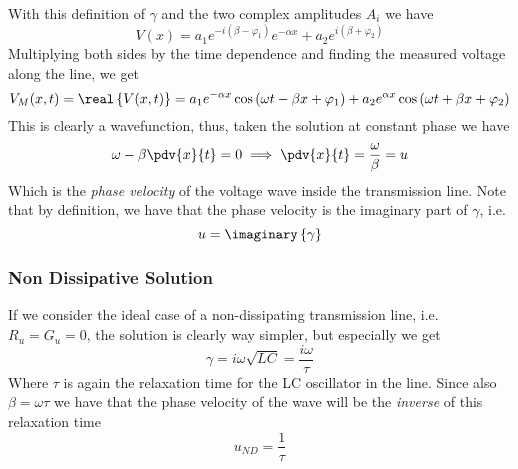 \documentclass[../electromagnetism.tex]{subfiles}
\begin{document}
With this definition of $\gamma$ and the two complex amplitudes $A_i$ we have
\begin{equation*}
	V(x)=a_1e^{-i\left( \beta-\varphi_1 \right)}e^{-\alpha x}+a_2e^{i\left(\beta+\varphi_2 \right)}
\end{equation*}
Multiplying both sides by the time dependence and finding the measured voltage along the line, we get
\begin{equation}
	V_M(x, t)=\real\left\{ V(x, t) \right\}=a_1e^{-\alpha x}\cos\left( \omega t-\beta x+\varphi_1 \right)+a_2e^{\alpha x}\cos\left( \omega t+\beta x+\varphi_2 \right)
	\label{eq:measvolt.tra}
\end{equation}
This is clearly a wavefunction, thus, taken the solution at constant phase we have
\begin{equation}
	\omega-\beta\pdv{x}{t}=0\implies\pdv{x}{t}=\frac{\omega}{\beta}=u
	\label{eq:phasevel.tra}
\end{equation}
Which is the \textit{phase velocity} of the voltage wave inside the transmission line. Note that by definition, we have that the phase velocity is the imaginary part of $\gamma$, i.e. 
\begin{equation*}
	u=\imaginary\left\{ \gamma \right\}
\end{equation*}
\subsubsection{Non Dissipative Solution}
If we consider the ideal case of a non-dissipating transmission line, i.e. $R_u=G_u=0$, the solution is clearly way simpler, but especially we get
\begin{equation}
	\gamma=i\omega\sqrt{LC}=\frac{i\omega}{\tau}
	\label{eq:nondissgamma.tra}
\end{equation}
Where $\tau$ is again the relaxation time for the LC oscillator in the line. Since also $\beta=\omega\tau$ we have that the phase velocity of the wave will be the \textit{inverse} of this relaxation time
\begin{equation}
	u_{ND}=\frac{1}{\tau}
	\label{eq:nondissphasevel.tra}
\end{equation}
\end{document}
